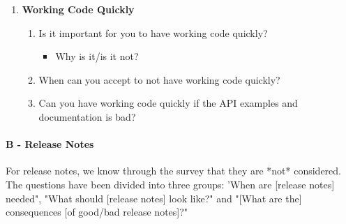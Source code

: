 \documentclass{article}
\begin{document}
\begin{enumerate}[label={A\Alph*}]
\item\textbf{Working Code Quickly}
\begin{enumerate}[label={AD\arabic*}]
\item Is it important for you to have working code quickly?
\begin{itemize}[label={-}]
\item Why is it/is it not?
\end{itemize}
\item When can you accept to not have working code quickly?
\item Can you have working code quickly if the API examples and documentation is bad?
\end{enumerate}
\end{enumerate}

\paragraph{B - Release Notes}
For release notes, we know through the survey that they are *not* considered.
The questions have been divided into three groups: 'When are [release notes] needed",
"What should [release notes] look like?" and "[What are the] consequences [of good/bad release notes]?"
\end{document}
